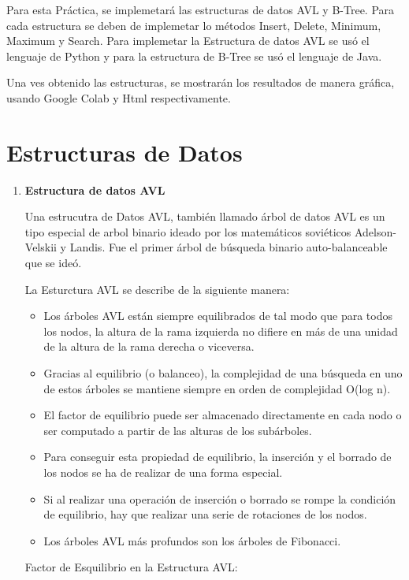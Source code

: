 \documentclass{article}
\begin{document}
	Para esta Práctica, se implemetará las estructuras de datos AVL y B-Tree. Para cada estructura se deben de implemetar lo métodos Insert, Delete, Minimum, Maximum y Search. Para implemetar la Estructura de datos AVL se usó el lenguaje de Python y para la estructura de B-Tree se usó el lenguaje de Java.

    Una ves obtenido las estructuras, se mostrarán los resultados de manera gráfica, usando Google Colab y Html respectivamente.
	
	
	\section{Estructuras de Datos}\label{sec:ejercicios}
	\begin{enumerate}
		\item \textbf{Estructura de datos AVL}
		
			Una estrucutra de Datos AVL, también llamado árbol de datos AVL es un tipo especial de arbol binario ideado por los matemáticos soviéticos Adelson-Velskii y Landis. Fue el primer árbol de búsqueda binario auto-balanceable que se ideó.

La Esturctura AVL se describe de la siguiente manera: 

\begin{itemize}
   \item Los árboles AVL están siempre equilibrados de tal modo que para todos los nodos, la altura de la rama izquierda no difiere en más de una unidad de la altura de la rama derecha o viceversa.
   \item Gracias al equilibrio (o balanceo), la complejidad de una búsqueda en uno de estos árboles se mantiene siempre en orden de complejidad O(log n).
   \item El factor de equilibrio puede ser almacenado directamente en cada nodo o ser computado a partir de las alturas de los subárboles.
   \item Para conseguir esta propiedad de equilibrio, la inserción y el borrado de los nodos se ha de realizar de una forma especial.
   \item Si al realizar una operación de inserción o borrado se rompe la condición de equilibrio, hay que realizar una serie de rotaciones de los nodos.
   \item Los árboles AVL más profundos son los árboles de Fibonacci.
\end{itemize}	

 Factor de Esquilibrio en la Estructura AVL:


\end{enumerate}
\end{document}
